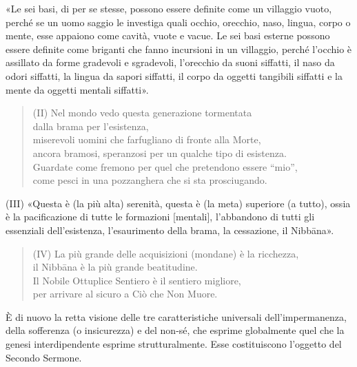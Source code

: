 

\label{pag254}«Le sei basi, di per se stesse, possono essere definite come un
villaggio vuoto, perché se un uomo saggio le investiga quali occhio,
orecchio, naso, lingua, corpo o mente, esse appaiono come cavità, vuote
e vacue. Le sei basi esterne possono essere definite come briganti che
fanno incursioni in un villaggio, perché l’occhio è assillato da forme
gradevoli e sgradevoli, l’orecchio da suoni siffatti, il naso da odori
siffatti, la lingua da sapori siffatti, il corpo da oggetti tangibili
siffatti e la mente da oggetti mentali siffatti».




\begin{quote}
(II) Nel mondo vedo questa generazione tormentata \\
dalla brama per l’esistenza, \\
miserevoli uomini che farfugliano di fronte alla Morte, \\
ancora bramosi, speranzosi per un qualche tipo di esistenza. \\
Guardate come fremono per quel che pretendono essere “mio”, \\
come pesci in una pozzanghera che si sta prosciugando.
\end{quote}



(III) «Questa è (la più alta) serenità, questa è (la meta) superiore (a
tutto), ossia è la pacificazione di tutte le formazioni [mentali],
l’abbandono di tutti gli essenziali dell’esistenza, l’esaurimento della
brama, la cessazione, il Nibbāna».




\begin{quote}
(IV) La più grande delle acquisizioni (mondane) è la ricchezza, \\
il Nibbāna è la più grande beatitudine. \\
Il Nobile Ottuplice Sentiero è il sentiero migliore, \\
per arrivare al sicuro a Ciò che Non Muore.
\end{quote}



 È di nuovo la retta visione delle tre caratteristiche
universali dell’impermanenza, della sofferenza (o insicurezza) e del
non-sé, che esprime globalmente quel che la genesi interdipendente
esprime strutturalmente. Esse costituiscono l’oggetto del Secondo
Sermone.


